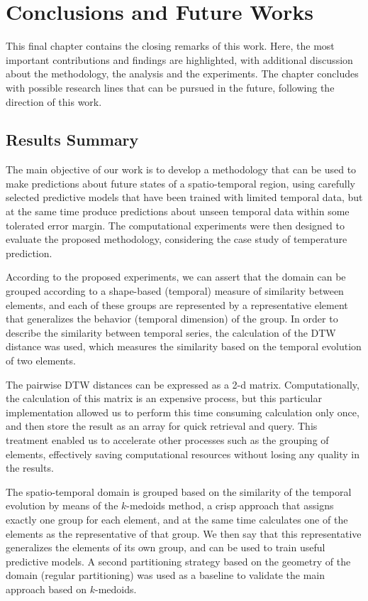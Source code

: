 \chapter{Conclusions and Future Works}
\label{chapter_Conclusions}

This final chapter contains the closing remarks of this work. Here, the most important contributions and findings are highlighted, with additional discussion about the methodology, the analysis and the experiments. The chapter concludes with possible research lines that can be pursued in the future, following the direction of this work.
	
\section{Results Summary}
\label{Sec:ResultsSummary}

The main objective of our work is to develop a methodology that can be used to make predictions about future states of a spatio-temporal region, using carefully selected predictive models that have been trained with limited temporal data, but at the same time produce predictions about unseen temporal data within some tolerated error margin. The computational experiments were then designed to evaluate the proposed methodology, considering the case study of temperature prediction.

According to the proposed experiments, we can assert that the domain can be grouped according to a shape-based (temporal) measure of similarity between elements, and each of these groups are represented by a representative element that generalizes the behavior (temporal dimension) of the group. In order to describe the similarity between temporal series, the calculation of the DTW distance was used, which measures the similarity based on the temporal evolution of two elements.

The pairwise DTW distances can be expressed as a 2-d matrix. Computationally, the calculation of this matrix is an expensive process, but this particular implementation allowed us to perform this time consuming calculation only once, and then store the result as an array for quick retrieval and query. This treatment enabled us to accelerate other processes such as the grouping of elements, effectively saving computational resources without losing any quality in the results.

The spatio-temporal domain is grouped based on the similarity of the temporal evolution by means of the $k$-medoids method, a crisp approach that assigns exactly one group for each element, and at the same time calculates one of the elements as the representative of that group. We then say that this representative generalizes the elements of its own group, and can be used to train useful predictive models. A second partitioning strategy based on the geometry of the domain (regular partitioning) was used as a baseline to validate the main approach based on $k$-medoids.

